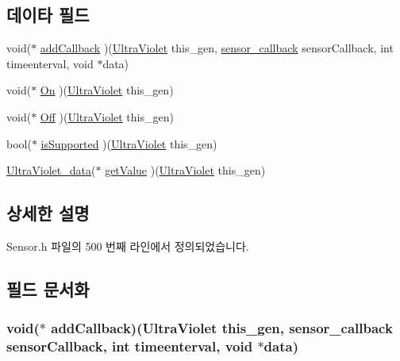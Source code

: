 \subsection*{데이타 필드}
\begin{DoxyCompactItemize}
\item 
void($\ast$ \hyperlink{struct___ultra_violet_a90e8e8909dc65107be66027f73c2c888}{add\-Callback} )(\hyperlink{_sensor_8h_a387fe6cb5841dad3dbb90b1eed691ab6}{Ultra\-Violet} this\-\_\-gen, \hyperlink{_sensor_8h_ad8114207845fc5e0aa30832f0c718cd6}{sensor\-\_\-callback} sensor\-Callback, int timeenterval, void $\ast$data)
\item 
void($\ast$ \hyperlink{struct___ultra_violet_a753f8c2c790a977e4d8cd2e68ee10e76}{On} )(\hyperlink{_sensor_8h_a387fe6cb5841dad3dbb90b1eed691ab6}{Ultra\-Violet} this\-\_\-gen)
\item 
void($\ast$ \hyperlink{struct___ultra_violet_a4eaa529090e12bd7eb2a2c568f0c0539}{Off} )(\hyperlink{_sensor_8h_a387fe6cb5841dad3dbb90b1eed691ab6}{Ultra\-Violet} this\-\_\-gen)
\item 
bool($\ast$ \hyperlink{struct___ultra_violet_a3c866c9d5dac5b54f8dabd80f2111c4c}{is\-Supported} )(\hyperlink{_sensor_8h_a387fe6cb5841dad3dbb90b1eed691ab6}{Ultra\-Violet} this\-\_\-gen)
\item 
\hyperlink{_sensor_8h_a7638ff5043cb10408c5bd3c3aef6e01c}{Ultra\-Violet\-\_\-data}($\ast$ \hyperlink{struct___ultra_violet_ad2f32aac4a27630b46e825c41eee7eb3}{get\-Value} )(\hyperlink{_sensor_8h_a387fe6cb5841dad3dbb90b1eed691ab6}{Ultra\-Violet} this\-\_\-gen)
\end{DoxyCompactItemize}


\subsection{상세한 설명}


Sensor.\-h 파일의 500 번째 라인에서 정의되었습니다.



\subsection{필드 문서화}
\hypertarget{struct___ultra_violet_a90e8e8909dc65107be66027f73c2c888}{
\subsubsection[{add\-Callback}]{\setlength{\rightskip}{0pt plus 5cm}void($\ast$  add\-Callback)({\bf Ultra\-Violet} this\-\_\-gen, {\bf sensor\-\_\-callback} sensor\-Callback, int timeenterval, void $\ast$data)}}\label{struct___ultra_violet_a90e8e8909dc65107be66027f73c2c888}


